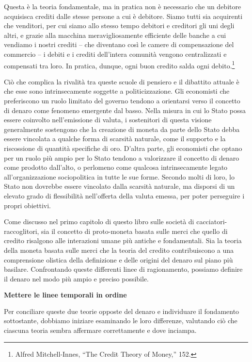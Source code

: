 \documentclass[
  a5paper,
  smalldemyvopaper,10pt,twoside,onecolumn,openright,extrafontsizes,hidelinks]{memoir}
\renewenvironment{quote}%
               {\list{}{\rightmargin=.6cm\leftmargin=.6cm}%
                \itshape \item[]}%
               {\endlist}
\begin{document}
\begin{quote}
Questa è la teoria fondamentale, ma in pratica non è necessario che un
debitore acquisisca crediti dalle stesse persone a cui è debitore. Siamo
tutti sia acquirenti che venditori, per cui siamo allo stesso tempo
debitori e creditori gli uni degli altri, e grazie alla macchina
meravigliosamente efficiente delle banche a cui vendiamo i nostri
crediti -- che diventano così le camere di compensazione del commercio
-- i debiti e i crediti dell'intera comunità vengono centralizzati e
compensati tra loro. In pratica, dunque, ogni buon credito salda ogni
debito.\footnote{Alfred Mitchell-Innes, ``The Credit Theory of Money,''
  152.}
\end{quote}

Ciò che complica la rivalità tra queste scuole di pensiero e il
dibattito attuale è che esse sono intrinsecamente soggette a
politicizzazione. Gli economisti che preferiscono un ruolo limitato del
governo tendono a orientarsi verso il concetto di denaro come fenomeno
emergente dal basso. Nella misura in cui lo Stato possa essere coinvolto
nell'emissione di valuta, i sostenitori di questa visione generalmente
sostengono che la creazione di moneta da parte dello Stato debba essere
vincolata a qualche forma di scarsità naturale, come il supporto e la
riscossione di quantità specifiche di oro. D'altra parte, gli economisti
che optano per un ruolo più ampio per lo Stato tendono a valorizzare il
concetto di denaro come prodotto dall'alto, o perlomeno come qualcosa
intrinsecamente legato all'organizzazione sociopolitica in tutte le sue
forme. Secondo molti di loro, lo Stato non dovrebbe essere vincolato
dalla scarsità naturale, ma disporsi di un elevato grado di flessibilità
nell'offerta della valuta emessa, per poter perseguire i propri
obiettivi.

Come discusso nel primo capitolo di questo libro sulle società di
cacciatori-raccoglitori, sia il concetto di proto-moneta basata sulle
merci che quello di credito risalgono alle interazioni umane più antiche
e fondamentali. Sia la teoria della moneta basata sulle merci che la
teoria del credito contribuiscono a una comprensione olistica della
definizione e delle origini del denaro sul piano più basilare.
Confrontando queste differenti linee di ragionamento, possiamo definire
il denaro nel modo più ampio e preciso possibile.

\textbf{Mettere le linee temporali in ordine}

Per conciliare queste due teorie opposte del denaro e individuare il
fondamento sottostante, dobbiamo iniziare esaminando le loro differenze,
valutando ciò che ciascuna teoria sembra affermare correttamente e dove
inciampa.
\end{document}
